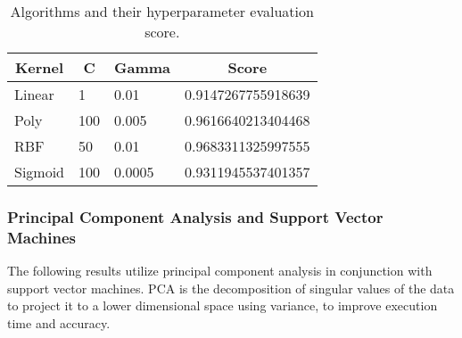 \begin{table}[H]
    \centering
    \begin{tabular}{|l|l|l|l|}\hline
        \multicolumn{1}{|c|}{Kernel} & \multicolumn{1}{|c|}{C} & \multicolumn{1}{|c|}{Gamma} & \multicolumn{1}{|c|}{Score} \\\hline
        Linear      & 1     & 0.01      & 0.9147267755918639 \\
        Poly        & 100   & 0.005     & 0.9616640213404468 \\
        RBF         & 50    & 0.01      & 0.9683311325997555 \\
        Sigmoid     & 100   & 0.0005    & 0.9311945537401357 \\\hline
    \end{tabular}
    \caption{Algorithms and their hyperparameter evaluation score.}
    \label{tab:svm_results_hyperparameter}
\end{table}
\subsubsection{Principal Component Analysis and Support Vector Machines}
The following results utilize principal component analysis in conjunction with support vector machines. 
PCA is the decomposition of singular values of the data to project it to a lower dimensional space using variance, to improve execution time and accuracy.

